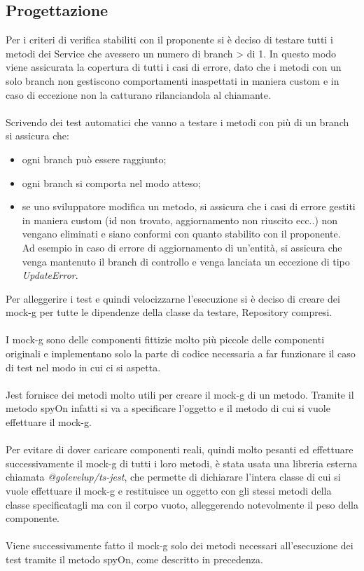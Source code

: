 \subsection{Progettazione}
Per i criteri di verifica stabiliti con il proponente si è deciso di testare tutti i metodi dei Service che
avessero un numero di branch > di 1. In questo modo viene assicurata la copertura di tutti i casi di errore,
dato che i metodi con un solo branch 
non gestiscono comportamenti inaspettati in maniera custom e in caso di eccezione non la catturano 
rilanciandola al chiamante.
\\\\
Scrivendo dei test automatici che vanno a testare i metodi con più di un branch si assicura che:
\begin{itemize}
    \item ogni branch può essere raggiunto;
    \item ogni branch si comporta nel modo atteso;
    \item se uno sviluppatore modifica un metodo, si assicura che i casi di errore gestiti in maniera custom (id non trovato, 
    aggiornamento non riuscito ecc..) non vengano eliminati e siano conformi con quanto stabilito con il proponente. 
    \\
    Ad esempio in caso di errore di aggiornamento di un'entità, si assicura che venga mantenuto il branch di controllo e
    venga lanciata un eccezione di tipo \textit{UpdateError}.
\end{itemize}
\leavevmode\newline
Per alleggerire i test e quindi velocizzarne l'esecuzione si è deciso di creare dei \gls{mock-g} per tutte le dipendenze
della classe da testare, Repository compresi.
\\\\
I \gls{mock-g} sono delle componenti fittizie molto più piccole delle componenti originali e implementano solo la parte di codice 
necessaria a far funzionare il caso di test nel modo in cui ci si aspetta.
\\\\
Jest fornisce dei metodi molto utili per creare il \gls{mock-g} di un metodo.
Tramite il metodo spyOn infatti si va a specificare l'oggetto e il metodo di cui si vuole effettuare il \gls{mock-g}.
\\\\
Per evitare di dover caricare componenti reali, quindi molto pesanti ed effettuare successivamente il \gls{mock-g} di tutti i loro metodi, è stata
usata una libreria esterna chiamata \textit{@golevelup/ts-jest}, che permette di dichiarare l'intera classe di cui si vuole effettuare
il \gls{mock-g} e restituisce un oggetto con gli stessi metodi della classe specificatagli ma con il corpo vuoto, 
alleggerendo notevolmente il peso della componente.
\\\\
Viene successivamente fatto il \gls{mock-g} solo dei metodi necessari all'esecuzione dei test tramite il metodo
spyOn, come descritto in precedenza.
\clearpage
